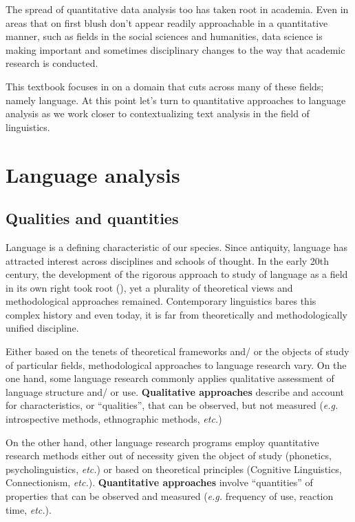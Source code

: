 \documentclass[
  letterpaper,
]{book}
\theoremstyle{definition}
\theoremstyle{remark}
\begin{document}
The spread of quantitative data analysis too has taken root in academia.
Even in areas that on first blush don't appear readily approachable in a
quantitative manner, such as fields in the social sciences and
humanities, data science is making important and sometimes disciplinary
changes to the way that academic research is conducted.

This textbook focuses in on a domain that cuts across many of these
fields; namely language. At this point let's turn to quantitative
approaches to language analysis as we work closer to contextualizing
text analysis in the field of linguistics.

\section{Language analysis}\label{language-analysis}

\subsection{Qualities and quantities}\label{qualities-and-quantities}

Language is a defining characteristic of our species. Since antiquity,
language has attracted interest across disciplines and schools of
thought. In the early 20th century, the development of the rigorous
approach to study of language as a field in its own right took root
(), yet a plurality of
theoretical views and methodological approaches remained. Contemporary
linguistics bares this complex history and even today, it is far from
theoretically and methodologically unified discipline.

Either based on the tenets of theoretical frameworks and/ or the objects
of study of particular fields, methodological approaches to language
research vary. On the one hand, some language research commonly applies
qualitative assessment of language structure and/ or use.
\textbf{Qualitative approaches} describe and account for
characteristics, or ``qualities'', that can be observed, but not
measured (\emph{e.g.} introspective methods, ethnographic methods,
\emph{etc.})

On the other hand, other language research programs employ quantitative
research methods either out of necessity given the object of study
(phonetics, psycholinguistics, \emph{etc.}) or based on theoretical
principles (Cognitive Linguistics, Connectionism, \emph{etc.}).
\textbf{Quantitative approaches} involve ``quantities'' of properties
that can be observed and measured (\emph{e.g.} frequency of use,
reaction time, \emph{etc.}).
\end{document}
